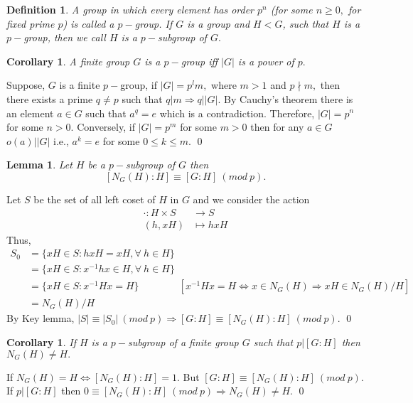 \documentclass[11pt]{amsart}
\newtheorem{defn}[theorem]{Definition}
\newtheorem{corollary}[theorem]{Corollary}%
\newtheorem{lemma}[theorem]{Lemma}%
\begin{document}
\begin{defn}
A group in which every element has order $p^n$ (for some $n\geq 0,$ for fixed prime $p$) is called a $p-$group. If $G$ is a group and $H<G$, such that $H$ is a $p-$group, then we call $H$ is a $p-$subgroup of $G.$
\end{defn}
\begin{corollary}
A finite group $G$ is a $p-$group iff $|G|$ is a power of $p.$
\end{corollary}
\proof  Suppose, $G$ is a finite $p-$group, if $|G|=p^lm,$ where $m>1$ and $p\nmid m,$ then there exists a prime $q\neq p$ such that $q|m \Rightarrow q\big| |G|.$ By Cauchy's theorem there is an element $a\in G$ such that $a^q=e$ which is a contradiction. Therefore, $|G|=p^n$ for some $n>0.$ Conversely, if $|G|=p^m$ for some $m>0$ then for any $a\in G$ $o(a)\big| |G|$ i.e., $a^k=e$ for some $0\leq k\leq m.$ \qed
\begin{lemma}
Let $H$ be a $p-$subgroup of $G$ then $$[N_G(H):H]\equiv [G:H]~(mod~p).$$
\end{lemma}
\proof Let $S$ be the set of all left coset of $H$ in $G$ and we consider the action \begin{align*}
\cdot:H\times S&\to S\\
(h,xH)&\mapsto hxH
\end{align*}
Thus, \begin{align*}
S_0&=\{xH\in S:hxH=xH,\forall~h\in H\}\\
&=\{xH\in S:x^{-1}hx\in H,\forall~h\in H\}\\
&=\{xH\in S:x^{-1}Hx=H\}\qquad\qquad[x^{-1}Hx=H \Leftrightarrow x\in N_G(H) \Rightarrow xH\in N_G(H)/H]\\
&=N_G(H)/H
\end{align*}
By Key lemma, $|S|\equiv |S_0|~(mod~p) \Rightarrow [G:H]\equiv [N_G(H):H]~(mod~p).$ \qed

\begin{corollary}
If $H$ is a $p-$subgroup of a finite group $G$ such that $p\big| [G:H]$ then $N_G(H)\neq H.$
\end{corollary}
\proof If $N_G(H)=H\Leftrightarrow [N_G(H):H]=1.$ But $[G:H]\equiv [N_G(H):H]~(mod~p).$ If $p\big| [G:H]$ then $0\equiv [N_G(H):H]~(mod~p) \Rightarrow N_G(H)\neq H.$ \qed
\end{document}
